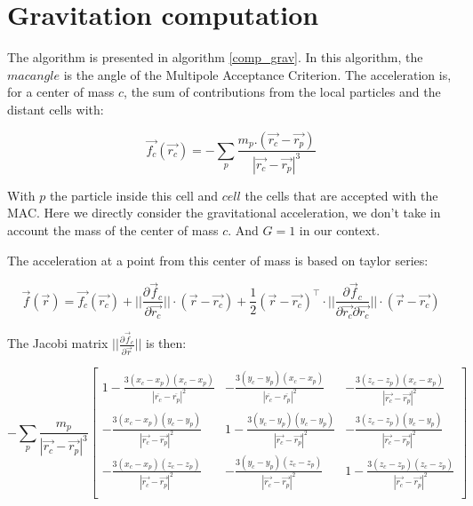 \documentclass[notes.tex]{subfiles}
\begin{document}
\section{Gravitation computation}

The algorithm is presented in algorithm \ref{comp_grav}.
In this algorithm, the $macangle$ is the angle of the Multipole Acceptance Criterion.
The acceleration is, for a center of mass $c$, the sum of contributions from the local particles and the distant cells with:

\begin{equation}
\vec{f_c}(\vec{r_c}) = -\sum_{p} \frac{m_p.(\vec{r_c}-\vec{r_p})}{|\vec{r_c}-\vec{r_p}|^3}
\end{equation}

With $p$ the particle inside this cell and $cell$ the cells that are accepted with the MAC.
Here we directly consider the gravitational acceleration, we don't take in account the mass of the center of mass $c$. And $G=1$ in our context.

The acceleration at a point from this center of mass is based on taylor series:

\begin{equation}
 \vec{f}(\vec{r}) = \vec{f_c}(\vec{r_c}) + ||\frac{\partial\vec{f}_c}{\partial\vec{r_c}}||\cdot (\vec{r} - \vec{r_c}) + \frac{1}{2} (\vec{r}-\vec{r_c})^\intercal \cdot   ||\frac{\partial\vec{f}_c}{\partial\vec{r_c} \partial\vec{r_c}}|| \cdot (\vec{r} - \vec{r_c})
 \end{equation}

The Jacobi matrix $||\frac{\partial\vec{f}_c}{\partial\vec{r}}||$  is then:



\begin{equation}
- \sum_p \frac{m_p}{|\vec{r_c}-\vec{r_p}|^3}
\begin{bmatrix}
1 - \frac{3(x_c-x_p)(x_c-x_p)}{|\overline{r_c}-\overline{r_p}|^2} & -\frac{3(y_c-y_p)(x_c-x_p)}{|\overline{r_c}-\overline{r_p}|^2}  & -\frac{3(z_c-z_p)(x_c-x_p)}{|\vec{r_c}-\vec{r_p}|^2}  \\
-\frac{3(x_c-x_p)(y_c-y_p)}{|\vec{r_c}-\vec{r_p}|^2}  & 1 - \frac{3(y_c-y_p)(y_c-y_p)}{|\vec{r_c}-\vec{r_p}|^2} &  -\frac{3(z_c-z_p)(y_c-y_p)}{|\vec{r_c}-\vec{r_p}|^2}\\
- \frac{3(x_c-x_p)(z_c-z_p)}{|\vec{r_c}-\vec{r_p}|^2}   &  -\frac{3(y_c-y_p)(z_c-z_p)}{|\vec{r_c}-\vec{r_p}|^2} &  1- \frac{3(z_c-z_p)(z_c-z_p)}{|\vec{r_c}-\vec{r_p}|^2} \\
\end{bmatrix}
 \end{equation}
\end{document}
